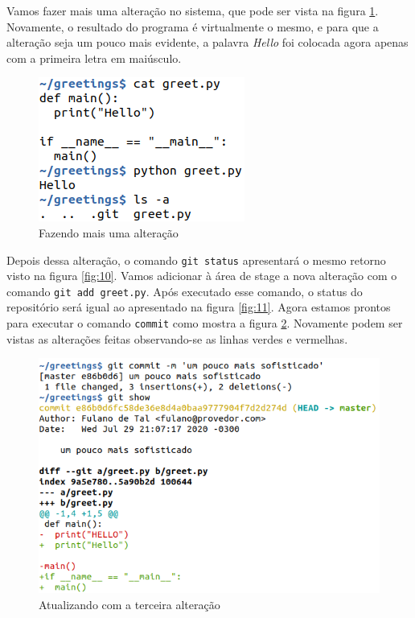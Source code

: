 \documentclass[a4paper]{book}
\begin{document}
Vamos fazer mais uma alteração no sistema, que pode ser
vista na figura \ref{fig:13}.
Novamente, o resultado do programa é virtualmente o mesmo,
e para que a alteração seja um pouco mais evidente, 
a palavra \textit{Hello} foi colocada agora apenas com
a primeira letra em maiúsculo.

\begin{figure}[ht]
\caption{Fazendo mais uma alteração}
\label{fig:13}
\centering
\includegraphics[scale=0.6,left]{"images/13-Fazendo mais uma alteração.png"}
\end{figure}

Depois dessa alteração, o comando \texttt{git status}
apresentará o mesmo retorno visto na figura \ref{fig:10}.
Vamos adicionar à área de stage a nova alteração com
o comando \texttt{git add greet.py}.
Após executado esse comando, o status do repositório
será igual ao apresentado na figura \ref{fig:11}.
%
Agora estamos prontos para executar o comando \texttt{commit} 
como mostra a figura \ref{fig:14}.
Novamente podem ser vistas as alterações feitas observando-se
as linhas verdes e vermelhas.

\begin{figure}[ht]
\caption{Atualizando com a terceira alteração}
\label{fig:14}
\centering
\includegraphics[scale=0.6,left]{"images/14-Atualizando com a terceira alteração.png"}
\end{figure}
\end{document}
